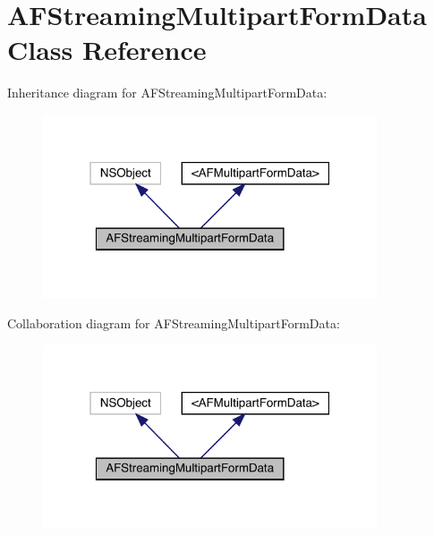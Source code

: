 \hypertarget{interface_a_f_streaming_multipart_form_data}{}\section{A\+F\+Streaming\+Multipart\+Form\+Data Class Reference}
\label{interface_a_f_streaming_multipart_form_data}


Inheritance diagram for A\+F\+Streaming\+Multipart\+Form\+Data\+:\nopagebreak
\begin{figure}[H]
\begin{center}
\leavevmode
\includegraphics[width=280pt]{interface_a_f_streaming_multipart_form_data__inherit__graph}
\end{center}
\end{figure}


Collaboration diagram for A\+F\+Streaming\+Multipart\+Form\+Data\+:\nopagebreak
\begin{figure}[H]
\begin{center}
\leavevmode
\includegraphics[width=280pt]{interface_a_f_streaming_multipart_form_data__coll__graph}
\end{center}
\end{figure}
